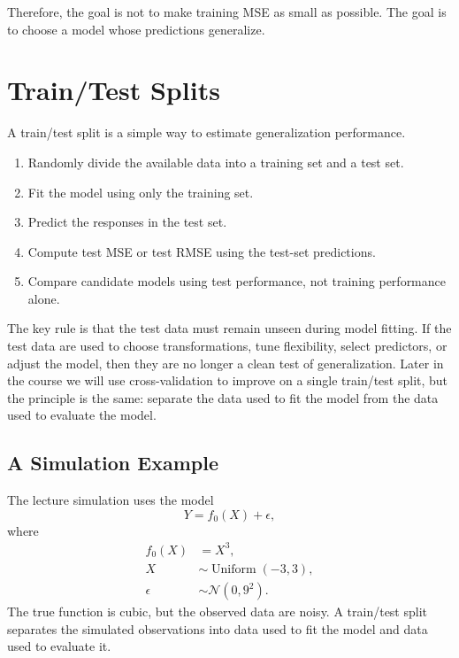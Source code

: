 {Therefore, the goal is not to make training MSE as small as possible.  The goal is to choose a model whose predictions generalize.

\section{Train/Test Splits}

A train/test split is a simple way to estimate generalization performance.

\begin{enumerate}
  \item Randomly divide the available data into a training set and a test set.
  \item Fit the model using only the training set.
  \item Predict the responses in the test set.
  \item Compute test MSE or test RMSE using the test-set predictions.
  \item Compare candidate models using test performance, not training performance alone.
\end{enumerate}

The key rule is that the test data must remain unseen during model fitting.  If the test data are used to choose transformations, tune flexibility, select predictors, or adjust the model, then they are no longer a clean test of generalization.  Later in the course we will use cross-validation to improve on a single train/test split, but the principle is the same: separate the data used to fit the model from the data used to evaluate the model.

\subsection{A Simulation Example}

The lecture simulation uses the model
\begin{equation}
  Y=f_0(X)+\epsilon,
  \label{eq:ch2-simulation-model}
\end{equation}
where
\begin{align*}
  f_0(X) &= X^3,\\
  X &\sim \operatorname{Uniform}(-3,3),\\
  \epsilon &\sim \mathcal{N}(0,9^2).
\end{align*}
The true function is cubic, but the observed data are noisy.  A train/test split separates the simulated observations into data used to fit the model and data used to evaluate it.

}
